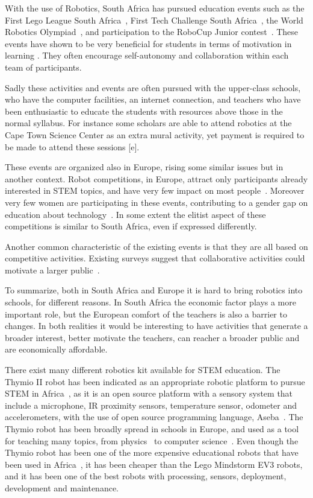 \documentclass{intech-journal}
\begin{document}
With the use of Robotics, South Africa has pursued education events such as the First Lego League South Africa~\cite{FLLSA}, First Tech Challenge South Africa~\cite{FTCA}, the World Robotics Olympiad~\cite{WRO}, and participation to the RoboCup Junior contest~\cite{ferrein2011robocup}. 
These events have shown to be very beneficial for students in terms of motivation in learning \cite{deci1985intrinsic}. 
They often encourage self-autonomy and collaboration within each team of participants.

Sadly these activities and events are often pursued with the upper-class schools, who have the computer facilities, an internet connection, and teachers who have been enthusiastic to educate the students with resources above those in the normal syllabus. 
For instance some scholars are able to attend robotics at the Cape Town Science Center as an extra mural activity, yet payment is required to be made to attend these sessions [e]. 

These events are organized also in Europe, rising some similar issues but in another context.
Robot competitions, in Europe, attract only participants already interested in STEM topics, and have very few impact on most people~\cite{riedo2013upgrade}.
Moreover very few women are participating in these events, contributing to a gender gap on education about technology~\cite{riedo2013upgrade}.
In some extent the elitist aspect of these competitions is similar to South Africa, even if expressed differently.


Another common characteristic of the existing events is that they are all based on competitive activities. 
Existing surveys suggest that collaborative activities could motivate a larger public~\cite{riedo2013upgrade}.

To summarize, both in South Africa and Europe it is hard to bring robotics into schools, for different reasons. 
In South Africa the economic factor plays a more important role, but the European comfort of the teachers is also a barrier to changes.
In both realities it would be interesting to have activities that generate a broader interest, better motivate the teachers, can reacher a broader public and are economically affordable.


There exist many different robotics kit available for STEM education. 
The Thymio II robot has been indicated as an appropriate robotic platform to pursue STEM in Africa~\cite{Gyebi2015}, as it is an open source platform with a sensory system that include a microphone, IR proximity sensors, temperature sensor, odometer and accelerometers, with the use of open source programming language, Aseba~\cite{magnenat2010aseba}. 
The Thymio robot has been broadly spread in schools in Europe\cite{roy2015inirobot}, and used as a tool for teaching many topics, from physics~\cite{Mubin2013} to computer science~\cite{magnenat2014}. 
Even though the Thymio robot has been one of the more expensive educational robots that have been used in Africa~\cite{Gyebi2015}, it has been cheaper than the Lego Mindstorm EV3 robots, and it has been one of the best robots with processing, sensors, deployment, development and maintenance.
\end{document}
